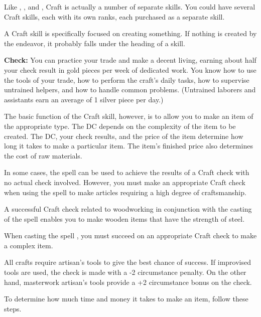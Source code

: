 
Like , , and , Craft is actually a number of separate 
skills. You could have several Craft skills, each with its own ranks, each purchased 
as a separate skill.

A Craft skill is specifically focused on creating something. If nothing is created 
by the endeavor, it probably falls under the heading of a  skill.

\textbf{Check:} You can practice your trade and make a decent living, earning about 
half your check result in gold pieces per week of dedicated work. You know how 
to use the tools of your trade, how to perform the craft's daily tasks, how to 
supervise untrained helpers, and how to handle common problems. (Untrained laborers 
and assistants earn an average of 1 silver piece per day.)

The basic function of the Craft skill, however, is to allow you to make an item 
of the appropriate type. The DC depends on the complexity of the item to be created. 
The DC, your check results, and the price of the item determine how long it takes 
to make a particular item. The item's finished price also determines the cost of 
raw materials.

In some cases, the  spell can be used to achieve the results 
of a Craft check with no actual check involved. However, you must make an appropriate 
Craft check when using the spell to make articles requiring a high degree of craftsmanship.

A successful Craft check related to woodworking in conjunction with the casting 
of the  spell enables you to make wooden items that have the strength 
of steel.

When casting the spell , you must succeed on an appropriate 
Craft check to make a complex item.

All crafts require artisan's tools to give the best chance of success. If improvised 
tools are used, the check is made with a -2 circumstance penalty. On the other 
hand, masterwork artisan's tools provide a +2 circumstance bonus on the check.

To determine how much time and money it takes to make an item, follow these steps.

